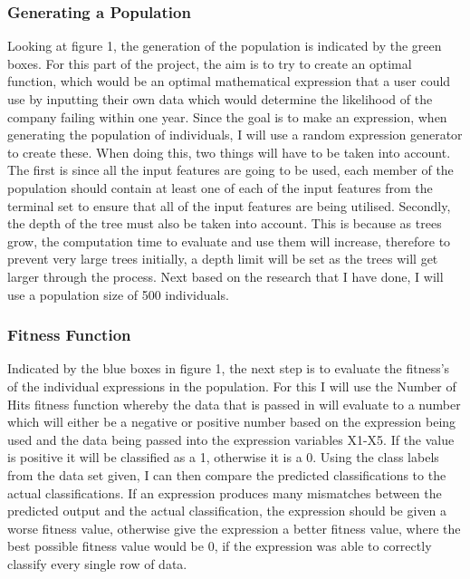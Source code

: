 \documentclass[11pt]{article}
\begin{document}
\subsubsection{Generating a Population}
Looking at figure 1, the generation of the population is indicated by the green boxes. For this part of the project, the aim is to try to create an optimal function, which would be an optimal mathematical expression that a user could use by inputting their own data which would determine the likelihood of the company failing within one year. Since the goal is to make an expression, when generating the population of individuals, I will use a random expression generator to create these. When doing this, two things will have to be taken into account. The first is since all the input features are going to be used, each member of the population should contain at least one of each of the input features from the terminal set to ensure that all of the input features are being utilised. Secondly, the depth of the tree must also be taken into account. This is because as trees grow, the computation time to evaluate and use them will increase, therefore to prevent very large trees initially, a depth limit will be set as the trees will get larger through the process.   Next based on the research that I have done, I will use a population size of 500 individuals.
\subsubsection{Fitness Function}
Indicated by the blue boxes in figure 1, the next step is to evaluate the fitness's of the individual expressions in the population. For this I will use the Number of Hits fitness function whereby the data that is passed in will evaluate to a number which will either be a negative or positive number based on the expression being used and the data being passed into the expression variables X1-X5. If the value is positive it will be classified as a 1, otherwise it is a 0. Using the class labels from the data set given, I can then compare the predicted classifications to the actual classifications. If an expression produces many mismatches between the predicted output and the actual classification, the expression should be given a worse fitness value, otherwise give the expression a better fitness value, where the best possible fitness value would be 0, if the expression was able to correctly classify every single row of data. 
\end{document}
